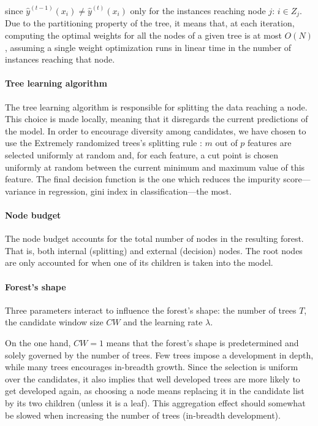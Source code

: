 \documentclass{article}
\begin{document}
since $\hat{y}^{(t-1)}(x_i) \neq \hat{y}^{(t)}(x_i)$ only for the instances 
reaching node $j$: $i \in Z_j$. Due to the partitioning property of the tree, 
it means that, at each iteration, computing the optimal weights for all the 
nodes of a given tree is at most $O(N)$, assuming a single weight optimization 
runs in linear time in the number of instances reaching that node.

\paragraph{Tree learning algorithm}
The tree learning algorithm is responsible for splitting the data reaching a 
node. This choice is made locally, meaning that it disregards the current 
predictions of the model. In order to encourage diversity among candidates, we 
have chosen to use the Extremely randomized trees's splitting rule 
\cite{extratrees}: $m$ out of $p$ features are selected uniformly at random 
and, for each feature, a cut point is chosen uniformly at random between the 
current minimum and maximum value of this feature. The final decision function 
is the one which reduces the impurity score---variance in regression, gini 
index in classification---the most.

\paragraph{Node budget}
The node budget accounts for the total number of nodes in the resulting forest. 
That is, both internal (splitting) and external (decision) nodes. The root 
nodes are only accounted for when one of its children is taken into the model.

\paragraph{Forest's shape}
Three parameters interact to influence the forest's shape: the number of trees 
$T$, the candidate window size $CW$ and the learning rate $\lambda$. 

On the one hand, $CW=1$ means that the forest's shape is predetermined and 
solely governed by the number of trees. Few trees impose a development in 
depth, while many trees encourages in-breadth growth. Since the selection 
is uniform over the candidates, it also implies that well developed trees are 
more likely to get developed again, as choosing a node means replacing it in 
the candidate list by its two children (unless it is a leaf). This aggregation 
effect should somewhat be slowed when increasing the number of trees 
(in-breadth development).
\end{document}
